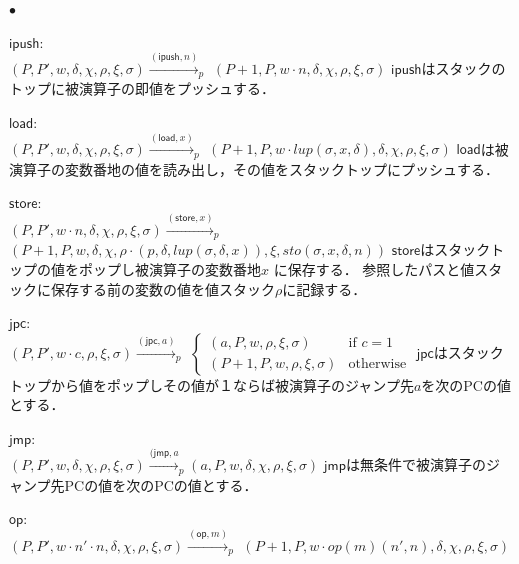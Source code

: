 \documentclass[submit,PRO]{ipsj}
\newcommand{\bcode}[1]{$\mathsf{#1}$}
\begin{document}
\begin{list}{$\bullet$}{}
\item \bcode{ipush}:\\
$(P,P',w,\delta,\chi,\rho,\xi,\sigma)\xrightarrow{(\mathsf{ipush},n)}_p$\newline
\qquad$(P+1,P,w\cdot n,\delta,\chi,\rho,\xi,\sigma)$\newline
\bcode{ipush}はスタックのトップに被演算子の即値をプッシュする．
\item \bcode{load}:\\
$(P,P',w,\delta,\chi,\rho,\xi,\sigma)\xrightarrow{(\mathsf{load},x)}_p$\newline
\qquad$(P+1,P,w\cdot lup(\sigma,x,\delta),\delta,\chi,\rho,\xi,\sigma)$\newline
\bcode{load}は被演算子の変数番地の値を読み出し，その値をスタックトップにプッシュする．
\item \bcode{store}:\\
$(P,P',w\cdot n,\delta,\chi,\rho,\xi,\sigma)\xrightarrow{(\mathsf{store},x)}_p$\newline
\qquad$(P+1,P,w,\delta,\chi,\rho\cdot(p,\delta,lup(\sigma,\delta,x)),\xi,sto(\sigma,x,\delta,n))$\newline
\bcode{store}はスタックトップの値をポップし被演算子の変数番地$x$ に保存する．
参照したパスと値スタックに保存する前の変数の値を値スタック$\rho$に記録する．
\item  \bcode{jpc}:\\
$(P,P',w\cdot c,\rho,\xi,\sigma)\xrightarrow{(\mathsf{jpc},a)}_p$\newline
\qquad\qquad$\begin{cases}
(a,P,w,\rho,\xi,\sigma) & \mbox{if $c=1$}\\
(P+1,P,w,\rho,\xi,\sigma) & \mbox{otherwise}
\end{cases}$
\newline
\bcode{jpc}はスタックトップから値をポップしその値が１ならば被演算子のジャンプ先$a$を次のPCの値とする． 
\item \bcode{jmp}:\\
$(P,P',w,\delta,\chi,\rho,\xi,\sigma)\xrightarrow{(\mathsf{jmp},a}_p
(a,P,w,\delta,\chi,\rho,\xi,\sigma)$\newline
\bcode{jmp}は無条件で被演算子のジャンプ先PCの値を次のPCの値とする．
\item \bcode{op}:\\
$(P,P',w\cdot n'\cdot n,\delta,\chi,\rho,\xi,\sigma)\xrightarrow{(\mathsf{op},m)}_p$\newline
\qquad $(P+1,P,w\cdot op(m)(n',n),\delta,\chi,\rho,\xi,\sigma)$\newline

\end{list}
\end{document}
